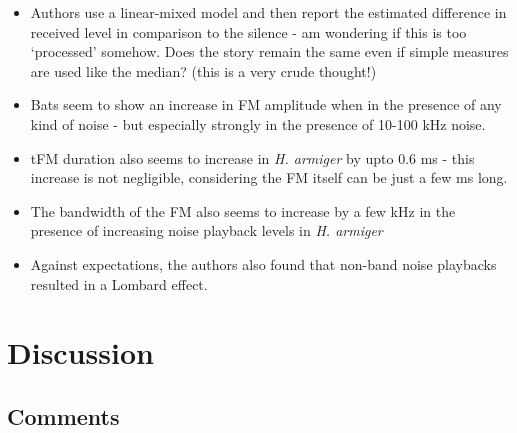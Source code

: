 \documentclass[
]{book}
\providecommand{\tightlist}{%
  \setlength{\itemsep}{0pt}\setlength{\parskip}{0pt}}
\begin{document}
\begin{itemize}
\tightlist
\item
  Authors use a linear-mixed model and then report the estimated difference in received level in comparison to the silence - am wondering if this is too `processed' somehow. Does the story remain the same even if simple measures are used like the median? (this is a very crude thought!)
\item
  Bats seem to show an increase in FM amplitude when in the presence of any kind of noise - but especially strongly in the presence of 10-100 kHz noise.
\item
  tFM duration also seems to increase in \emph{H. armiger} by upto 0.6 ms - this increase is not negligible, considering the FM itself can be just a few ms long.
\item
  The bandwidth of the FM also seems to increase by a few kHz in the presence of increasing noise playback levels in \emph{H. armiger}
\item
  Against expectations, the authors also found that non-band noise playbacks resulted in a Lombard effect.
\end{itemize}

\hypertarget{discussion-5}{%
\section{Discussion}\label{discussion-5}}

\hypertarget{comments-9}{%
\subsection{Comments}\label{comments-9}}
\end{document}
